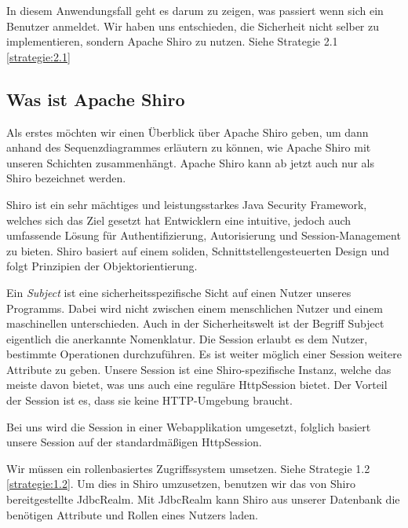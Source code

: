 \documentclass[enabledeprecatedfontcommands,fontsize=12pt,paper=a4,twoside]{scrartcl}
\begin{document}
{In diesem Anwendungsfall geht es darum zu zeigen, was passiert wenn sich ein
Benutzer anmeldet. Wir haben uns entschieden, die Sicherheit nicht selber zu
implementieren, sondern Apache Shiro zu nutzen. Siehe Strategie 2.1 \ref{strategie:2.1}

\subsection{Was ist Apache Shiro}
Als erstes möchten wir einen Überblick über Apache Shiro geben, um dann anhand
des Sequenzdiagrammes erläutern zu können, wie Apache Shiro mit unseren Schichten
zusammenhängt. Apache Shiro kann ab jetzt auch nur als Shiro bezeichnet werden.

Shiro ist ein sehr mächtiges und leistungsstarkes Java Security Framework,
welches sich das Ziel gesetzt hat Entwicklern eine intuitive, jedoch auch
umfassende Lösung für Authentifizierung, Autorisierung und Session-Management zu
bieten. Shiro basiert auf einem soliden, Schnittstellengesteuerten Design und
folgt Prinzipien der Objektorientierung.

Ein \emph{Subject} ist eine sicherheitsspezifische Sicht auf einen Nutzer
unseres Programms. Dabei wird nicht zwischen einem menschlichen Nutzer und
einem maschinellen unterschieden. Auch in der Sicherheitswelt ist der Begriff
Subject eigentlich die anerkannte Nomenklatur. Die Session erlaubt es dem
Nutzer, bestimmte Operationen durchzuführen. Es ist weiter möglich einer Session
weitere Attribute zu geben. Unsere Session ist eine Shiro-spezifische Instanz,
welche das meiste davon bietet,  was uns auch eine reguläre HttpSession
bietet. Der Vorteil der Session ist es, dass sie keine HTTP-Umgebung braucht.

Bei uns wird die Session in einer Webapplikation umgesetzt, folglich basiert
unsere Session auf der standardmäßigen HttpSession.

Wir müssen ein rollenbasiertes Zugriffssystem umsetzen.
Siehe Strategie 1.2 \ref{strategie:1.2}. Um dies in Shiro umzusetzen, benutzen wir das von Shiro bereitgestellte
JdbcRealm. Mit JdbcRealm kann Shiro aus unserer Datenbank die benötigen
Attribute und Rollen eines Nutzers laden.

}
\end{document}
